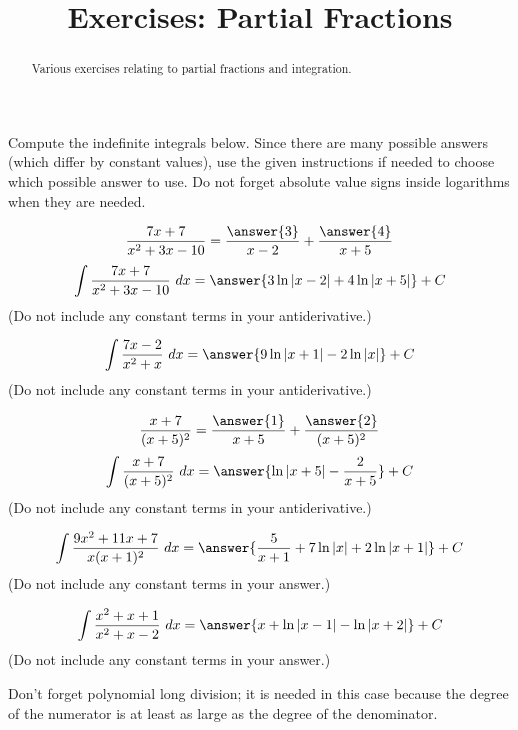 \documentclass{ximera}
\title{Exercises: Partial Fractions}
\begin{document}
\begin{abstract}
Various exercises relating to partial fractions and integration.
\end{abstract}
\maketitle


Compute the indefinite integrals below. Since there are many possible answers (which differ by constant values), use the given instructions if needed to choose which possible answer to use. Do not forget absolute value signs inside logarithms when they are needed.

\begin{exercise}%
\[ \frac{7x+7}{x^2+3x-10} = \frac{\answer{3}}{x-2} + \frac{\answer{4}}{x+5} \]
\[ \int \frac{7x+7}{x^2+3x-10}\ dx = \answer{3 \ln |x-2|+4 \ln |x+5|}+C\]
(Do not include any constant terms in your antiderivative.)
\end{exercise}

\begin{exercise}%
\[ \int \frac{7x-2}{x^2+x}\ dx = \answer{9 \ln |x+1|-2 \ln |x|}+C\]
(Do not include any constant terms in your antiderivative.)
%
%
\end{exercise}

\begin{exercise}%
\[ \frac{x+7}{(x+5)^2} = \frac{\answer{1}}{x+5} + \frac{\answer{2}}{(x+5)^2} \]
\[ \int \frac{x+7}{(x+5)^2}\ dx = \answer{\ln |x+5|-\frac{2}{x+5}}+C\]
(Do not include any constant terms in your antiderivative.)
%
%
\end{exercise}


\begin{exercise}%
\[ \int \frac{9x^2+11x+7}{x(x+1)^2}\ dx = \answer{\frac{5}{x+1}+7 \ln |x|+2 \ln |x+1|}+C\]
(Do not include any constant terms in your answer.)
%
%
\end{exercise}

\begin{exercise}%
\[ \int \frac{x^2+x+1}{x^2+x-2}\ dx = \answer{x+\ln |x-1|-\ln |x+2|}+C \]
(Do not include any constant terms in your answer.)
\begin{hint}
Don't forget polynomial long division; it is needed in this case because the degree of the numerator is at least as large as the degree of the denominator.
\end{hint}
%
%
\end{exercise}
\end{document}
